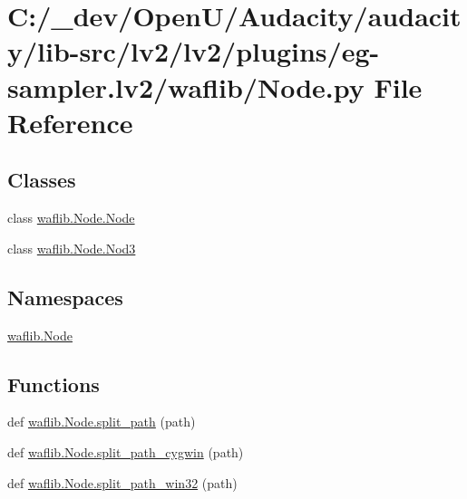 \hypertarget{lv2_2plugins_2eg-sampler_8lv2_2waflib_2_node_8py}{}\section{C\+:/\+\_\+dev/\+Open\+U/\+Audacity/audacity/lib-\/src/lv2/lv2/plugins/eg-\/sampler.lv2/waflib/\+Node.py File Reference}
\label{lv2_2plugins_2eg-sampler_8lv2_2waflib_2_node_8py}
\subsection*{Classes}
\begin{DoxyCompactItemize}
\item 
class \hyperlink{classwaflib_1_1_node_1_1_node}{waflib.\+Node.\+Node}
\item 
class \hyperlink{classwaflib_1_1_node_1_1_nod3}{waflib.\+Node.\+Nod3}
\end{DoxyCompactItemize}
\subsection*{Namespaces}
\begin{DoxyCompactItemize}
\item 
 \hyperlink{namespacewaflib_1_1_node}{waflib.\+Node}
\end{DoxyCompactItemize}
\subsection*{Functions}
\begin{DoxyCompactItemize}
\item 
def \hyperlink{namespacewaflib_1_1_node_ae580a314d04691a283552a4712b56a84}{waflib.\+Node.\+split\+\_\+path} (path)
\item 
def \hyperlink{namespacewaflib_1_1_node_a089fc378e3863231aab10b6892a9bc2b}{waflib.\+Node.\+split\+\_\+path\+\_\+cygwin} (path)
\item 
def \hyperlink{namespacewaflib_1_1_node_a20acd7540bbb7886232accfe0a2a4219}{waflib.\+Node.\+split\+\_\+path\+\_\+win32} (path)
\end{DoxyCompactItemize}
